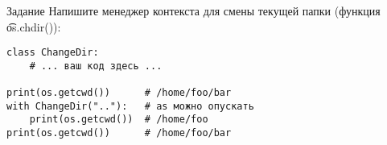 \begin{frame}[fragile]{Задание}
	Напишите менеджер контекста для смены текущей папки (функция \t{os.chdir()}):
\begin{verbatim}
class ChangeDir:
    # ... ваш код здесь ...

print(os.getcwd())      # /home/foo/bar
with ChangeDir(".."):   # as можно опускать
    print(os.getcwd())  # /home/foo
print(os.getcwd())      # /home/foo/bar
\end{verbatim}
\end{frame}
